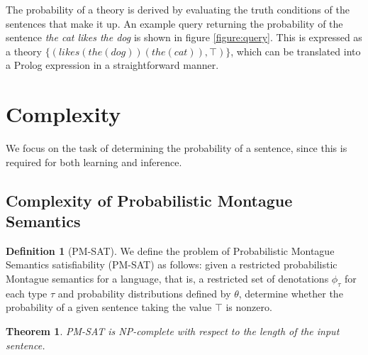 \documentclass[11pt]{article}
\newtheorem*{theorem}{Theorem}
\theoremstyle{definition}
\newtheorem*{definition}{Definition}
\newcommand{\hide}[1]{}
\begin{document}
The probability of a theory is derived by evaluating the truth
conditions of the sentences that make it up.\hide{Note that probability
distributions are defined over models, not theories, so that to
evaluate the probability of a theory it is necessary to sum over the
probabilities of all of its satisfying models. To achieve this, the
predicate \texttt{prob} is used.} An example query returning the
probability of the sentence {\em the cat likes the dog\/} is shown in
figure \ref{figure:query}. This is expressed as a theory
$\{(\mathit{likes}(\mathit{the}(\mathit{dog}))(\mathit{the}(\mathit{cat})),\top)\}$,
which can be translated into a Prolog expression in a straightforward
manner.


\section{Complexity}

We focus on the task of determining the probability of a sentence,
since this is required for both learning and inference.

\subsection{Complexity of Probabilistic Montague Semantics}

\begin{definition}[PM-SAT]
  We define the problem of Probabilistic Montague Semantics
  satisfiability (PM-SAT) as follows: given a restricted probabilistic
  Montague semantics for a language, that is, a restricted set of
  denotations $\phi_\tau$ for each type $\tau$ and probability
  distributions defined by $\theta$, determine whether the probability
  of a given sentence taking the value $\top$ is nonzero.
\end{definition}

\begin{theorem}
  \emph{PM-SAT} is NP-complete with respect to the length of the input
  sentence.
\end{theorem}
\end{document}

